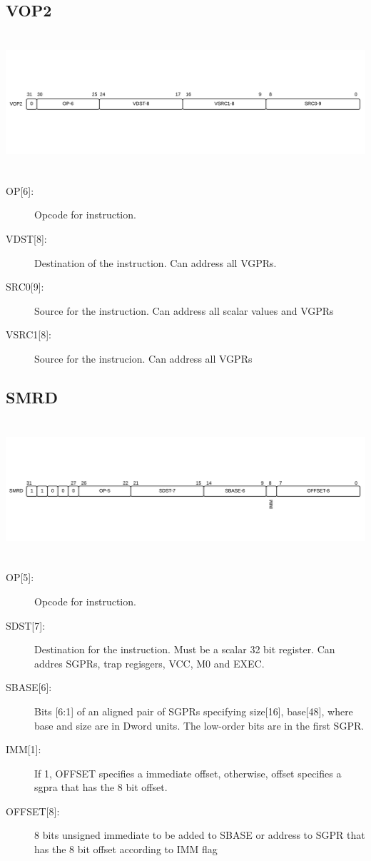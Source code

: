 \documentclass{article}
\begin{document}
\subsection{VOP2}
\includegraphics[width=7in, height=2in]{vop2.png} \\
\begin{description}
  \item [{OP[6]:}] Opcode for instruction.
  \item [{VDST[8]:}] Destination of the instruction. Can address all VGPRs.
  \item [{SRC0[9]:}] Source for the instruction. Can address all scalar values and VGPRs
  \item [{VSRC1[8]:}] Source for the instrucion. Can address all VGPRs
\end{description}

\subsection{SMRD}
\includegraphics[width=7in, height=2in]{smrd.png} \\
\begin{description}
  \item [{OP[5]:}] Opcode for instruction.
  \item [{SDST[7]:}]  Destination for the instruction. Must be a scalar 32 bit register. Can addres SGPRs, trap regisgers, VCC, M0 and EXEC.
  \item [{SBASE[6]:}] Bits [6:1] of an aligned pair of SGPRs specifying {size[16], base[48]}, where base and size are in Dword units. The low-order bits are in the first SGPR.
  \item [{IMM[1]:}] If 1, OFFSET specifies a immediate offset, otherwise, offset specifies a sgpra that has the 8 bit offset.
  \item [{OFFSET[8]:}] 8 bits unsigned immediate to be added to SBASE or address to SGPR that has the 8 bit offset according to IMM flag
\end{description}
\end{document}
